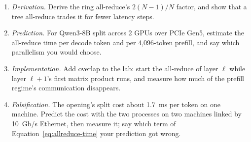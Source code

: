 \begin{enumerate}
\item \emph{Derivation.} Derive the ring all-reduce's $2(N-1)/N$ factor, and
  show that a tree all-reduce trades it for fewer latency steps.
\item \emph{Prediction.} For Qwen3-8B split across 2 GPUs over PCIe Gen5,
  estimate the all-reduce time per decode token and per 4,096-token prefill,
  and say which parallelism you would choose.
\item \emph{Implementation.} Add overlap to the lab: start the all-reduce of
  layer $\ell$ while layer $\ell+1$'s first matrix product runs, and measure
  how much of the prefill regime's communication disappears.
\item \emph{Falsification.} The opening's split cost about 1.7~ms per token on
  one machine. Predict the cost with the two processes on two machines linked
  by 10~Gb/s Ethernet, then measure it; say which term of
  Equation~\ref{eq:allreduce-time} your prediction got wrong.
\end{enumerate}
